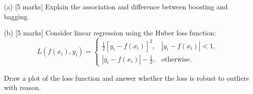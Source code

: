(a) [5 marks] Explain the association and difference between boosting and bagging.


(b) [5 marks] Consider linear regression using the Huber loss function:
\[
L(f(x_i),y_i)=
\begin{cases}
\frac12[y_i-f(x_i)]^2,&|y_i-f(x_i)|<1,\\
|y_i-f(x_i)|-\frac12,&\text{otherwise}.
\end{cases}
\]


Draw a plot of the loss function and answer whether the loss is robust to outliers with reason.
